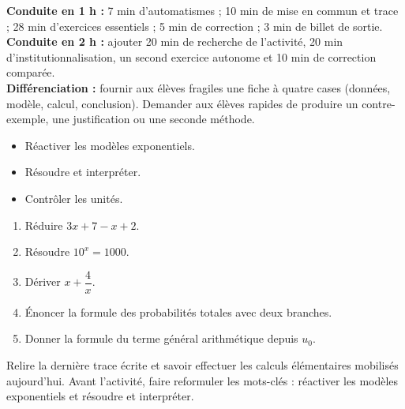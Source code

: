 \ifprof
\begin{methode}
\textbf{Conduite en 1 h :} 7 min d'automatismes ; 10 min de mise en commun et trace ; 28 min d'exercices essentiels ; 5 min de correction ; 3 min de billet de sortie.\\
\textbf{Conduite en 2 h :} ajouter 20 min de recherche de l'activité, 20 min d'institutionnalisation, un second exercice autonome et 10 min de correction comparée.\\
\textbf{Différenciation :} fournir aux élèves fragiles une fiche à quatre cases (données, modèle, calcul, conclusion). Demander aux élèves rapides de produire un contre-exemple, une justification ou une seconde méthode.
\end{methode}
\fi
{}
\begin{objectifs}\begin{itemize}\item Réactiver les modèles exponentiels.\item Résoudre et interpréter.\item Contrôler les unités.\end{itemize}\end{objectifs}
\begin{automatismes}\begin{enumerate}\item Réduire $3x+7-x+2$. \item Résoudre $10^x=1000$. \item Dériver $x+\dfrac4x$. \item Énoncer la formule des probabilités totales avec deux branches. \item Donner la formule du terme général arithmétique depuis $u_0$. \end{enumerate}\end{automatismes}
\begin{prerequis}Relire la dernière trace écrite et savoir effectuer les calculs élémentaires mobilisés aujourd'hui. Avant l'activité, faire reformuler les mots-clés : réactiver les modèles exponentiels et résoudre et interpréter.\end{prerequis}


